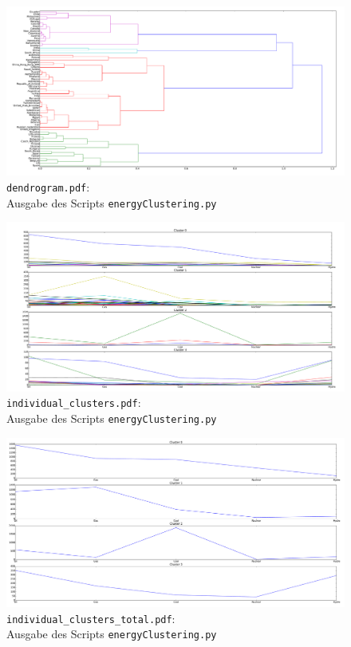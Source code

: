 \documentclass[12pt,a4paper]{scrartcl}
\begin{document}
\newpage
\begin{figure}[!h]
\includegraphics[width=\textwidth]{Plots/dendrogram.pdf}
\caption{\lstinline{dendrogram.pdf}: \\Ausgabe des Scripts \lstinline{energyClustering.py}}
\end{figure}
\begin{figure}[!h]
\includegraphics[width=\textwidth]{Plots/individual_clusters.pdf}
\caption{\lstinline{individual_clusters.pdf}: \\Ausgabe des Scripts \lstinline{energyClustering.py}}
\end{figure}
\begin{figure}[!h]
\includegraphics[width=\textwidth]{Plots/individual_clusters_total.pdf}
\caption{\lstinline{individual_clusters_total.pdf}: \\Ausgabe des Scripts \lstinline{energyClustering.py}}
\end{figure}
\end{document}
